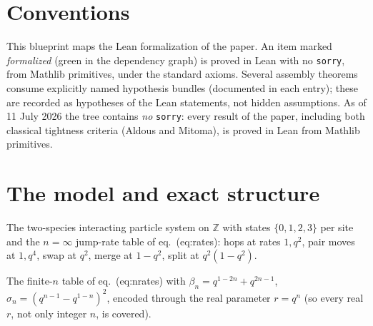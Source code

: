 \chapter*{Conventions}
This blueprint maps the Lean formalization of the paper. An item marked
\emph{formalized} (green in the dependency graph) is proved in Lean with
no \texttt{sorry}, from Mathlib primitives, under the standard axioms.
Several assembly theorems consume explicitly named hypothesis bundles
(documented in each entry); these are recorded as hypotheses of the Lean
statements, not hidden assumptions. As of 11 July 2026 the tree contains \emph{no} \texttt{sorry}: every result
of the paper, including both classical tightness criteria (Aldous and Mitoma),
is proved in Lean from Mathlib primitives.

%
%

\chapter{The model and exact structure}

\begin{definition}[type D ASEP rates, $n=\infty$]\label{def:rates}
  \leanok
  The two-species interacting particle system on $\mathbb Z$ with states
  $\{0,1,2,3\}$ per site and the $n=\infty$ jump-rate table of eq.~(eq:rates):
  hops at rates $1, q^2$, pair moves at $1, q^4$, swap at $q^2$, merge at
  $1-q^2$, split at $q^2(1-q^2)$.
\end{definition}

\begin{definition}\label{def:nrates}
  \leanok
  The finite-$n$ table of eq.~(eq:nrates) with
  $\beta_n = q^{1-2n}+q^{2n-1}$, $\sigma_n = (q^{n-1}-q^{1-n})^2$, encoded through
  the real parameter $r = q^n$ (so every real $r$, not only integer $n$, is covered).
\end{definition}

